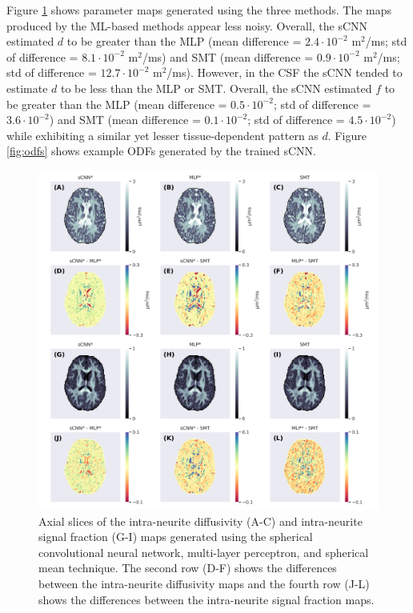 \documentclass[10pt, letterpaper, oneside]{article}
\begin{document}
Figure \ref{fig:2-compartment_model_maps} shows parameter maps generated using the three methods. The maps produced by the ML-based methods appear less noisy. Overall, the sCNN estimated $d$ to be greater than the MLP (mean difference = $2.4 \cdot 10^{-2}$ \textmu m$^2$/ms; std of difference = $8.1 \cdot 10^{-2}$ \textmu m$^2$/ms) and SMT (mean difference = $0.9 \cdot 10^{-2}$ \textmu m$^2$/ms; std of difference = $12.7 \cdot 10^{-2}$ \textmu m$^2$/ms). However, in the CSF the sCNN tended to estimate $d$ to be less than the MLP or SMT. Overall, the sCNN estimated $f$ to be greater than the MLP (mean difference = $0.5 \cdot 10^{-2}$; std of difference = $3.6 \cdot 10^{-2}$) and SMT (mean difference = $0.1 \cdot 10^{-2}$; std of difference = $4.5 \cdot 10^{-2}$) while exhibiting a similar yet lesser tissue-dependent pattern as $d$. Figure \ref{fig:odfs} shows example ODFs generated by the trained sCNN.

\begin{figure}
  \centering
  \includegraphics[width=.99\linewidth]{figures/comparison-figure.png}
  \caption{Axial slices of the intra-neurite diffusivity (A-C) and intra-neurite signal fraction (G-I) maps generated using the spherical convolutional neural network, multi-layer perceptron, and spherical mean technique. The second row (D-F) shows the differences between the intra-neurite diffusivity maps and the fourth row (J-L) shows the differences between the intra-neurite signal fraction maps.}
  \label{fig:2-compartment_model_maps}
\end{figure}
\end{document}
